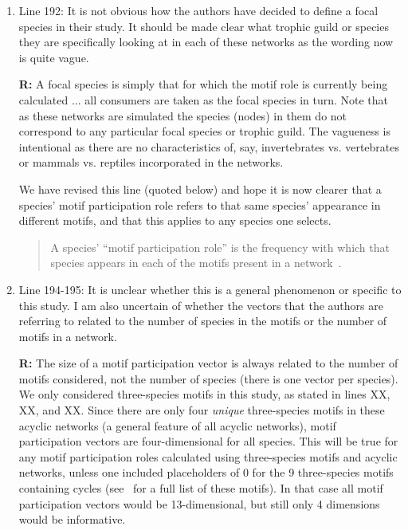 \documentclass[12pt]{article}
\begin{document}
\begin{enumerate}
            \item Line 192: It is not obvious how the authors have decided to define a focal species in their study. It should be made clear what trophic guild or species they are specifically looking at in each of these networks as the wording now is quite vague.

                \textbf{R:} A focal species is simply that for which the motif role is currently being calculated ... all consumers are taken as the focal species in turn. Note that as these networks are simulated the species (nodes) in them do not correspond to any particular focal species or trophic guild. The vagueness is intentional as there are no characteristics of, say, invertebrates vs. vertebrates or mammals vs. reptiles incorporated in the networks. 

                We have revised this line (quoted below) and hope it is now clearer that a species' motif participation role refers to that same species' appearance in different motifs, and that this applies to any species one selects.
                \begin{quotation}
                A species' ``motif participation role'' is the frequency with which that species appears in each of the motifs present in a network~\citep{Stouffer2012}.
                \end{quotation}


            \item Line 194-195: It is unclear whether this is a general phenomenon or specific to this study. I am also uncertain of whether the vectors that the authors are referring to related to the number of species in the motifs or the number of motifs in a network.

                \textbf{R:} The size of a motif participation vector is always related to the number of motifs considered, not the number of species (there is one vector per species). We only considered three-species motifs in this study, as stated in lines XX, XX, and XX. Since there are only four \emph{unique} three-species motifs in these acyclic networks (a general feature of all acyclic networks), motif participation vectors are four-dimensional for all species. This will be true for any motif participation roles calculated using three-species motifs and acyclic networks, unless one included placeholders of 0 for the 9 three-species motifs containing cycles (see~\citep{Stouffer2007} for a full list of these motifs). In that case all motif participation vectors would be 13-dimensional, but still only 4 dimensions would be informative.



\end{enumerate}
\end{document}
